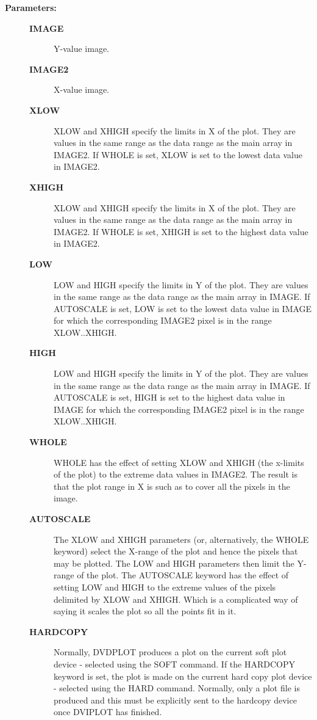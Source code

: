 \begin{description}
\begin{description}
\item [\textbf{Parameters:}]
\begin{description}
\item [\textbf{IMAGE}]
 Y-value image.
\item [\textbf{IMAGE2}]
 X-value image.
\item [\textbf{XLOW}]
 XLOW and XHIGH specify the limits in X of the plot.
 They are values in the same range as the data range
 as the main array in IMAGE2.  If WHOLE is set, XLOW
 is set to the lowest data value in IMAGE2.
\item [\textbf{XHIGH}]
 XLOW and XHIGH specify the limits in X of the plot.
 They are values in the same range as the data range
 as the main array in IMAGE2.  If WHOLE is set, XHIGH
 is set to the highest data value in IMAGE2.
\item [\textbf{LOW}]
 LOW and HIGH specify the limits in Y of the plot.
 They are values in the same range as the data range
 as the main array in IMAGE.  If AUTOSCALE is set, LOW
 is set to the lowest data value in IMAGE for which
 the corresponding IMAGE2 pixel is in the range XLOW..XHIGH.
\item [\textbf{HIGH}]
 LOW and HIGH specify the limits in Y of the plot.
 They are values in the same range as the data range
 as the main array in IMAGE.  If AUTOSCALE is set, HIGH
 is set to the highest data value in IMAGE for which
 the corresponding IMAGE2 pixel is in the range XLOW..XHIGH.
\item [\textbf{WHOLE}]
 WHOLE has the effect of setting XLOW and XHIGH (the x-limits
 of the plot) to the extreme data values in IMAGE2.  The
 result is that the plot range in X is such as to cover all
 the pixels in the image.
\item [\textbf{AUTOSCALE}]
 The XLOW and XHIGH parameters (or, alternatively, the WHOLE
 keyword) select the X-range of the plot and hence the pixels
 that may be plotted.  The LOW and HIGH parameters then limit
 the Y-range of the plot.  The AUTOSCALE keyword has the effect
 of setting LOW and HIGH to the extreme values of the pixels
 delimited by XLOW and XHIGH.  Which is a complicated way of
 saying it scales the plot so all the points fit in it.
\item [\textbf{HARDCOPY}]
 Normally, DVDPLOT produces a plot on the current soft plot
 device - selected using the SOFT command.  If the HARDCOPY
 keyword is set, the plot is made on the current hard
 copy plot device - selected using the HARD command.
 Normally, only a plot file is produced and this must be
 explicitly sent to the hardcopy device once DVIPLOT has
 finished.
\end{description}


\end{description}
\end{description}
